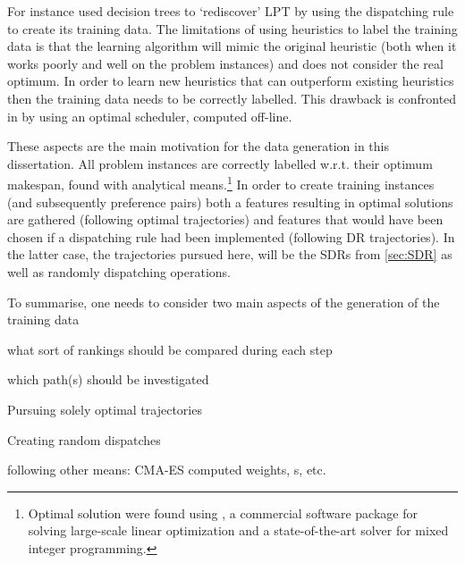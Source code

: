For instance \cite{Siggi05} used decision trees to `rediscover' LPT by using the dispatching rule to create its training data. The limitations of using heuristics to label the training data is that the learning algorithm will mimic the original heuristic (both when it works poorly and well on the problem instances) and does not consider the real optimum. In order to learn new heuristics that can outperform existing heuristics then the training data needs to be correctly labelled. This drawback is confronted in \citep{Malik08,Russell09,Siggi10} by using an optimal scheduler, computed off-line. 

These aspects are the main motivation for the data generation in this dissertation. 
All problem instances are correctly labelled w.r.t. their optimum makespan, found with analytical means.\footnote{Optimal solution were found using \cite{gurobi}, a commercial software package for solving large-scale linear optimization and a state-of-the-art solver for mixed integer programming.} 
In order to create training instances (and subsequently preference pairs) both a features resulting in optimal solutions are gathered (following optimal trajectories) and features that would have been chosen if a dispatching rule had been implemented (following DR trajectories). 
In the latter case, the trajectories pursued here, will be the SDRs from \cref{sec:SDR} as well as randomly dispatching operations.

To summarise, one needs to consider two main aspects of the generation of the 
training data
\begin{enumerate*}[label={\emph{\Roman*})},
        itemjoin={{? }}, itemjoin*={{? And }}, after={{}}]
    \item what sort of rankings should be compared during each step
    \item which path(s) should be investigated
    \begin{enumerate*}[label=\textit{\Roman{enumi}.\roman*)}, before={{? }},
        itemjoin={{? }}, itemjoin*={{? Or }}, after={{}}]
    \item Pursuing solely optimal trajectories
    \item Creating random dispatches
    \item following other means: CMA-ES computed weights, \sdr s, etc.
    \end{enumerate*}
\end{enumerate*}


